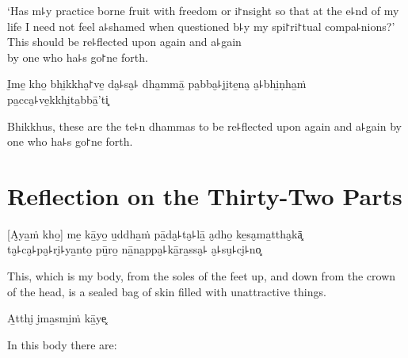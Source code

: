 \begin{english}
  `Has m꜕y practice borne fruit with freedom or i꜓nsight so that at the e꜕nd of my life I need not feel a꜕shamed when questioned b꜕y my spi꜓ri꜓tual compa꜕nions?'\\
  This should be re꜕flected upon again and a꜕gain\\
  by one who ha꜕s go꜓ne forth.
\end{english}

I̮me̱ kho̱ bhi̱kkha̮꜓ve̱ da̮꜕sa̮꜕ dha̱mmā̱ pa̱bba̮꜕ji̮te̱na̮ a̮꜕bhi̱ṇha̱ṁ pa̱cca̮꜕ve̱kkhi̮ta̱bbā̱'ti͓

\begin{english}
  Bhikkhus, these are the te꜕n dhammas to be re꜕flected upon again and a꜕gain by one who ha꜕s go꜓ne forth.
\end{english}

\chapter[Thirty-Two Parts]{Reflection on the Thirty-Two Parts}


\begin{leader}
\end{leader}

[A̮ya̱ṁ kho̱] me̱ kā̱yo̱ u̱ddha̱ṁ pā̱da̮꜕ta̮꜕lā̱ a̮dho̱ ke̱sa̮ma̱ttha̮kā͓\\
ta̮꜕ca̮꜕pa̮꜕ri̮꜕ya̱nto̱ pū̱ro̱ nā̱na̱ppa̮꜕kā̱ra̱ssa̮꜕ a̮꜕su̮꜕ci̮꜕no͓

\begin{english}
  This, which is my body, from the soles of the feet up, and down from the crown of the head, is a sealed bag of skin filled with unattractive things.
\end{english}

A̱tthi̮ i̮ma̱smi̱ṁ kā̱ye͓

\begin{english}
  In this body there are:
\end{english}

